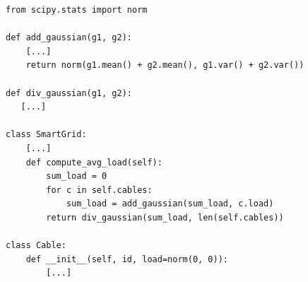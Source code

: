 %
%
%
%
%

\begin{lstlisting}[style=pythonStyle, caption=Limitation using a probability library (Python), label=lst:limit-lib-proba, linewidth=0.97\textwidth]
from scipy.stats import norm

def add_gaussian(g1, g2):
    [...]
    return norm(g1.mean() + g2.mean(), g1.var() + g2.var())

def div_gaussian(g1, g2):
   [...]

class SmartGrid:
    [...]
    def compute_avg_load(self):
        sum_load = 0
        for c in self.cables:
            sum_load = add_gaussian(sum_load, c.load)
        return div_gaussian(sum_load, len(self.cables))

class Cable:
    def __init__(self, id, load=norm(0, 0)):
        [...]
\end{lstlisting}

